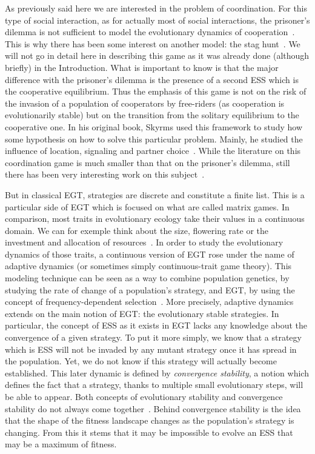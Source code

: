     As previously said here we are interested in the problem of coordination. For this type of social interaction, as for actually most of social interactions, the prisoner's dilemma is not sufficient to model the evolutionary dynamics of cooperation~\cite{Alvard2002, Skyrms2004}. This is why there has been some interest on another model: the stag hunt~\cite{Skyrms2004, RequejoMartinez2013}. We will not go in detail here in describing this game as it was already done (although briefly) in the Introduction. What is important to know is that the major difference with the prisoner's dilemma is the presence of a second ESS which is the cooperative equilibrium. Thus the emphasis of this game is not on the risk of the invasion of a population of cooperators by free-riders (as cooperation is evolutionarily stable) but on the transition from the solitary equilibrium to the cooperative one. In his original book, Skyrms used this framework to study how some hypothesis on how to solve this particular problem. Mainly, he studied the influence of location, signaling and partner choice~\cite{Skyrms2004}. While the literature on this coordination game is much smaller than that on the prisoner's dilemma, still there has been very interesting work on this subject~\cite{Santos2005, Pacheco2009, Iyer2016}.

    But in classical EGT, strategies are discrete and constitute a finite list. This is a particular side of EGT which is focused on what are called matrix games. In comparison, most traits in evolutionary ecology take their values in a continuous domain. We can for exemple think about the size, flowering rate or the investment and allocation of resources~\cite{McGill2007}. In order to study the evolutionary dynamics of those traits, a continuous version of EGT rose under the name of adaptive dynamics (or sometimes simply continuous-trait game theory). This modeling technique can be seen as a way to combine population genetics, by studying the rate of change of a population's strategy, and EGT, by using the concept of frequency-dependent selection~\cite{Geritz1998, McGill2007}. More precisely, adaptive dynamics extends on the main notion of EGT: the evolutionary stable strategies. In particular, the concept of ESS as it exists in EGT lacks any knowledge about the convergence of a given strategy. To put it more simply, we know that a strategy which is ESS will not be invaded by any mutant strategy once it has spread in the population. Yet, we do not know if this strategy will actually become established. This later dynamic is defined by \emph{convergence stability}, a notion which defines the fact that a strategy, thanks to multiple small evolutionary steps, will be able to appear. Both concepts of evolutionary stability and convergence stability do not always come together~\cite{Eshel1981, Eshel1983}. Behind convergence stability is the idea that the shape of the fitness landscape changes as the population's strategy is changing. From this it stems that it may be impossible to evolve an ESS that may be a maximum of fitness.

